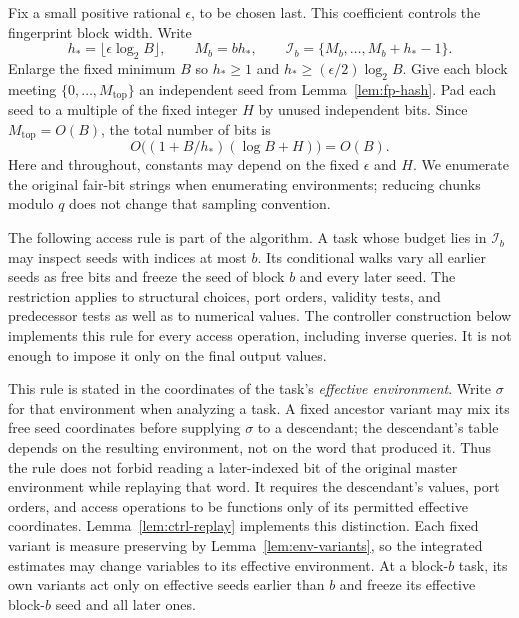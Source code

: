 Fix a small positive rational $\epsilon$, to be chosen last.
This coefficient controls the fingerprint block width. Write
\begin{equation}
 h_*=\lfloor\epsilon\log_2 B\rfloor,\qquad
 M_b=bh_*,\qquad
 \mathcal I_b=\{M_b,\ldots,M_b+h_*-1\}.
 \label{eq:fp-blocks}
\end{equation}
Enlarge the fixed minimum $B$ so $h_*\ge1$ and
$h_*\ge(\epsilon/2)\log_2B$.  Give each block meeting
$\{0,\ldots,M_{\mathrm{top}}\}$ an independent seed from
Lemma~\ref{lem:fp-hash}.  Pad each seed to a multiple of the fixed integer
$H$ by unused independent bits.  Since $M_{\mathrm{top}}=O(B)$, the total
number of bits is
\begin{equation}
 O\bigl((1+B/h_*)(\log B+H)\bigr)=O(B).
 \label{eq:fp-salt-space}
\end{equation}
Here and throughout, constants may depend on the fixed $\epsilon$ and $H$.
We enumerate the original fair-bit strings when enumerating environments;
reducing chunks modulo $q$ does not change that sampling convention.

The following access rule is part of the algorithm.  A task whose budget
lies in $\mathcal I_b$ may inspect seeds with indices at most $b$.  Its
conditional walks vary all earlier seeds as free bits and freeze the seed
of block $b$ and every later seed.  The restriction applies to structural
choices, port orders, validity tests, and predecessor tests as well as to
numerical values.  The controller construction below implements this rule
for every access operation, including inverse queries.  It is not enough
to impose it only on the final output values.

This rule is stated in the coordinates of the task's \emph{effective
environment}.  Write $\sigma$ for that environment when analyzing a
task.  A fixed ancestor variant may mix its free seed coordinates before
supplying $\sigma$ to a descendant; the descendant's table depends on
the resulting environment, not on the word that produced it.  Thus the
rule does not forbid reading a later-indexed bit of the original master
environment while replaying that word.  It requires the descendant's
values, port orders, and access operations to be functions only of
its permitted effective coordinates.  Lemma~\ref{lem:ctrl-replay}
implements this distinction.  Each fixed variant is measure preserving
by Lemma~\ref{lem:env-variants}, so the integrated estimates may change
variables to its effective environment.  At a
block-$b$ task, its own variants act only on effective seeds earlier
than $b$ and freeze its effective block-$b$ seed and all later ones.

